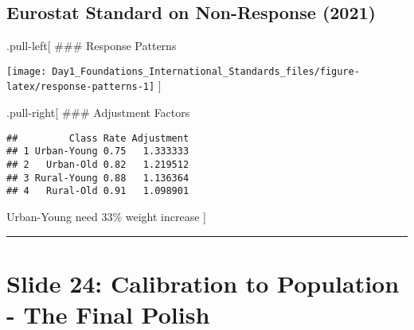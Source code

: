 \documentclass[
]{article}
\newenvironment{Shaded}{\begin{snugshade}}{\end{snugshade}}
\newcommand{\AttributeTok}[1]{\textcolor[rgb]{0.13,0.29,0.53}{#1}}
\newcommand{\CommentTok}[1]{\textcolor[rgb]{0.56,0.35,0.01}{\textit{#1}}}
\newcommand{\DecValTok}[1]{\textcolor[rgb]{0.00,0.00,0.81}{#1}}
\newcommand{\FloatTok}[1]{\textcolor[rgb]{0.00,0.00,0.81}{#1}}
\newcommand{\FunctionTok}[1]{\textcolor[rgb]{0.13,0.29,0.53}{\textbf{#1}}}
\newcommand{\NormalTok}[1]{#1}
\newcommand{\OtherTok}[1]{\textcolor[rgb]{0.56,0.35,0.01}{#1}}
\newcommand{\SpecialCharTok}[1]{\textcolor[rgb]{0.81,0.36,0.00}{\textbf{#1}}}
\newcommand{\StringTok}[1]{\textcolor[rgb]{0.31,0.60,0.02}{#1}}
\begin{document}
\subsection{Eurostat Standard on Non-Response
(2021)}\label{eurostat-standard-on-non-response-2021}

.pull-left{[} \#\#\# Response Patterns

\texttt{[image: Day1\_Foundations\_International\_Standards\_files/figure-latex/response-patterns-1]}
{]}

.pull-right{[} \#\#\# Adjustment Factors

\begin{Shaded}
\end{Shaded}

\begin{verbatim}
##         Class Rate Adjustment
## 1 Urban-Young 0.75   1.333333
## 2   Urban-Old 0.82   1.219512
## 3 Rural-Young 0.88   1.136364
## 4   Rural-Old 0.91   1.098901
\end{verbatim}

Urban-Young need 33\% weight increase {]}

\begin{center}\rule{0.5\linewidth}{0.5pt}\end{center}

\section{Slide 24: Calibration to Population - The Final
Polish}\label{slide-24-calibration-to-population---the-final-polish}
\end{document}
